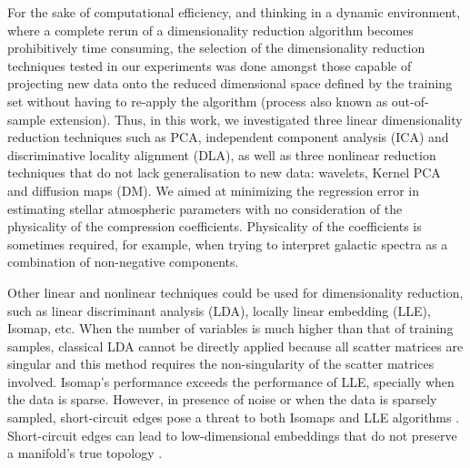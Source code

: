 \documentclass[a4paper,fleqn,usenatbib]{mnras}
\begin{document}
For the sake of computational efficiency, and thinking in a 
dynamic environment, where a complete rerun of a dimensionality 
reduction algorithm becomes prohibitively time consuming, 
the selection of the dimensionality reduction techniques tested
  in our experiments was done amongst those capable of projecting new
  data onto the reduced dimensional space defined by the training set
  without having to re-apply the algorithm (process also known as 
  out-of-sample extension). Thus, in this work, we investigated three
linear dimensionality reduction techniques such as PCA, independent
component analysis (ICA) and discriminative locality alignment (DLA),
as well as three nonlinear reduction techniques that do not lack 
generalisation to new data: wavelets, Kernel PCA and diffusion maps (DM). 
We aimed at minimizing the regression
  error in estimating stellar atmospheric parameters with no
  consideration of the physicality of the compression
  coefficients. Physicality of the coefficients is sometimes
  required, for example, when trying to interpret galactic spectra as
  a combination of non-negative components.


Other linear and nonlinear techniques could be used for dimensionality 
reduction, such as linear discriminant analysis (LDA), locally linear 
embedding (LLE), Isomap, etc. When the number of variables is much 
higher than that of training samples, classical LDA cannot be directly 
applied because all scatter matrices are singular and this method 
requires the non-singularity of the scatter matrices involved. 
Isomap's performance exceeds the performance of LLE, specially when 
the data is sparse. However, in presence of noise or when the data 
is sparsely sampled, short-circuit edges pose a threat to both Isomaps 
and LLE algorithms \citep{saxena:04}. Short-circuit edges can lead to 
low-dimensional embeddings that do not preserve a manifold's true topology \citep{balasubramanianISOMAP:02}.


\end{document}
